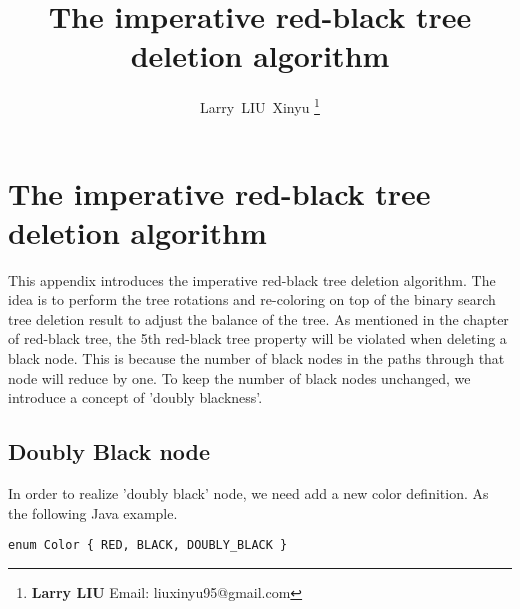 \documentclass[UTF8]{article}
\begin{document}


\title{The imperative red-black tree deletion algorithm}

\author{Larry~LIU~Xinyu
\thanks{{\bfseries Larry LIU} \newline
  Email: liuxinyu95@gmail.com \newline}
  }

\maketitle
\fi


\ifx\wholebook\relax
\chapter{The imperative red-black tree deletion algorithm}
\fi


This appendix introduces the imperative red-black tree deletion algorithm. The idea is to perform the tree rotations and re-coloring on top of the binary search tree deletion result to adjust the balance of the tree. As mentioned in the chapter of red-black tree, the 5th red-black tree property will be violated when deleting a black node. This is because the number of black nodes in the paths through that node will reduce by one. To keep the number of black nodes unchanged, we introduce a concept of 'doubly blackness'.

\section{Doubly Black node}

In order to realize 'doubly black' node, we need add a new color definition. As the following Java example.

\lstset{language=Java}
\begin{lstlisting}
enum Color { RED, BLACK, DOUBLY_BLACK }
\end{lstlisting}
\end{document}
